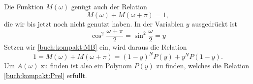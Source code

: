 Die Funktion $M(\omega)$ genügt auch der Relation
\[
M(\omega) + M(\omega+\pi)=1,
\]
die wir bis jetzt noch nicht genutzt haben.
In der Variablen $y$ ausgedrückt ist
\[
\cos^2\frac{\omega+\pi}2
=
\sin^2\frac{\omega}2
=
y
\]
Setzen wir \eqref{buch:kompakt:MB} ein, wird daraus die Relation
\begin{equation}
1
=
M(\omega) + M(\omega+\pi)
=
(1-y)^N P(y) + y^N P(1-y).
\label{buch:kompakt:Prel}
\end{equation}
Um $A(\omega)$ zu finden ist also ein Polynom
$P(y)$ zu finden, welches die Relation
\eqref{buch:kompakt:Prel} erfüllt.


